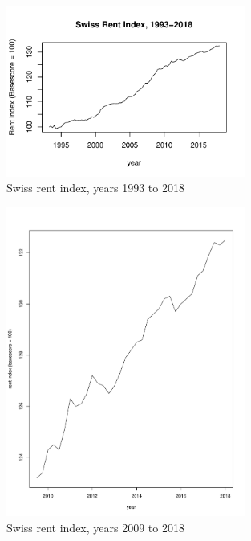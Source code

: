 \documentclass[11pt,a4paper]{article}
\begin{document}
\begin{figure}
\centering
\includegraphics[angle=0,
width=0.7\textwidth]{indiceloyers_timeseries}
\caption{Swiss rent index, years 1993 to 2018\label{fig:indiceloyers_timeseries}}
\end{figure}
\begin{figure}
\centering
\includegraphics[angle=0,
width=0.7\textwidth]{indiceloyers_test}
\caption{Swiss rent index, years 2009 to 2018\label{fig:indiceloyers_test}}
\end{figure}
\end{document}
